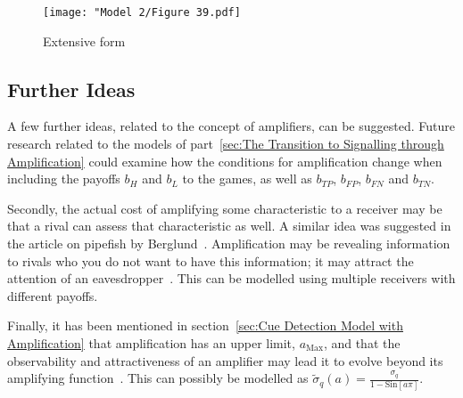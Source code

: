 \documentclass[a4paper,12pt]{article}
\numberwithin{equation}{section}
\begin{document}
\begin{figure}[h]
\begin{center}
\leavevmode
\texttt{[image: "Model 2/Figure 39.pdf]}
\caption{Extensive form}
\label{fig:Model 2/Figure 39.pdf}
\end{center}
\end{figure}

\newpage


\subsection{Further Ideas}
\label{sec:Appendix/Further Ideas}

A few further ideas, related to the concept of amplifiers, can be suggested. Future research related to the models of part~\ref{sec:The Transition to Signalling through Amplification} could examine how the conditions for amplification change when including the payoffs $b_{H}$ and $b_{L}$ to the games, as well as $b_{TP}$, $b_{FP}$, $b_{FN}$ and $b_{TN}$.

Secondly, the actual cost of amplifying some characteristic to a receiver may be that a rival can assess that characteristic as well. A similar idea was suggested in the article on pipefish by Berglund~\cite{Berglund2000}. Amplification may be revealing information to rivals who you do not want to have this information; it may attract the attention of an eavesdropper~\cite{Johnstone1998}. This can be modelled using multiple receivers with different payoffs.

Finally, it has been mentioned in section~\ref{sec:Cue Detection Model with Amplification} that amplification has an upper limit, $a_{\text{Max}}$, and that the observability and attractiveness of an amplifier may lead it to evolve beyond its amplifying function~\cite{Hasson1991}. This can possibly be modelled as $\tilde{\sigma}_{q}(a)=\frac{\sigma_{q}}{1-\text{Sin}[a \pi]}$.
\end{document}
